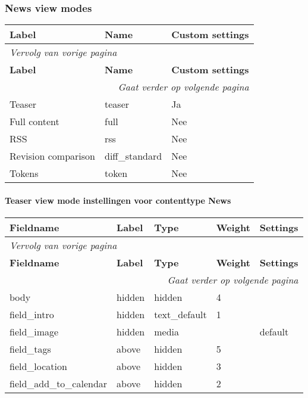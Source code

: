 \subsubsection{News view modes}
  \begin{longtable}{| p{5.00cm}|p{5.00cm}|p{5.00cm}|}
  \hline
  \rowcolor{tableheader}
  \textbf{Label} & \textbf{Name} & \textbf{Custom settings}  \tabularnewline
  \hline
\endfirsthead
\multicolumn{3}{l}{\textit{Vervolg van vorige pagina}} \\
\hline
\rowcolor{tableheader}
  \textbf{Label} & \textbf{Name} & \textbf{Custom settings}  \tabularnewline
  \hline
\hline
\endhead
\multicolumn{3}{r}{\textit{Gaat verder op volgende pagina}} \\
\endfoot
\hline
\endlastfoot
  Teaser & teaser & Ja  \tabularnewline
  \hline
  Full content & full & Nee  \tabularnewline
  \hline
  RSS & rss & Nee  \tabularnewline
  \hline
  Revision comparison & diff\_standard & Nee  \tabularnewline
  \hline
  Tokens & token & Nee  \tabularnewline
  \hline
  \end{longtable}

\paragraph{Teaser view mode instellingen voor contenttype News }

  \begin{longtable}{| p{3.00cm}|p{3.00cm}|p{3.00cm}|p{3.00cm}|p{3.00cm}|}
  \hline
  \rowcolor{tableheader}
  \textbf{Fieldname} & \textbf{Label} & \textbf{Type} & \textbf{Weight} & \textbf{Settings}  \tabularnewline
  \hline
\endfirsthead
\multicolumn{5}{l}{\textit{Vervolg van vorige pagina}} \\
\hline
\rowcolor{tableheader}
  \textbf{Fieldname} & \textbf{Label} & \textbf{Type} & \textbf{Weight} & \textbf{Settings}  \tabularnewline
  \hline
\hline
\endhead
\multicolumn{5}{r}{\textit{Gaat verder op volgende pagina}} \\
\endfoot
\hline
\endlastfoot
  body & hidden & hidden & 4 &    \tabularnewline
  \hline
  field\_intro & hidden & text\_default & 1 &    \tabularnewline
  \hline
  field\_image & hidden & media &   & default  \tabularnewline
  \hline
  field\_tags & above & hidden & 5 &    \tabularnewline
  \hline
  field\_location & above & hidden & 3 &    \tabularnewline
  \hline
  field\_add\_to\_calendar & above & hidden & 2 &    \tabularnewline
  \hline
  \end{longtable}

